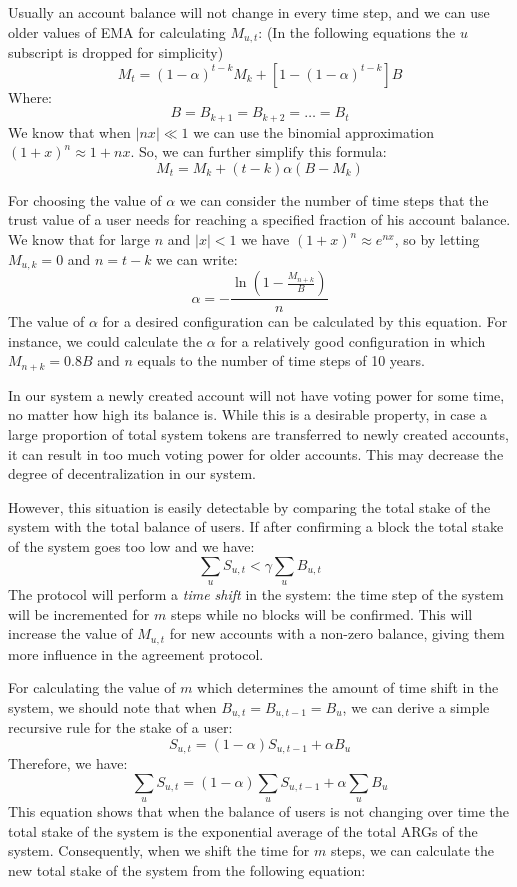 \documentclass[11pt, A4]{report}
\begin{document}
    Usually an account balance will not change in every time step, and we can use older values of EMA for calculating
    \(M_{u,t}\): (In the following equations the \(u\) subscript is dropped for simplicity)
    \[
        M_{t} = (1 - \alpha)^{t-k}M_{k} + [1 - (1 - \alpha)^{t - k}]B
    \]
    Where:
    \[
        B = B_{k+1} = B_{k+2} = \dots = B_{t}
    \]
    We know that when \(|nx| \ll 1\) we can use the binomial approximation \({(1 + x)^n \approx 1 + nx}\). So, we can
    further simplify this formula:
    \[
        M_{t} = M_{k} + (t - k) \alpha (B - M_{k})
    \]

    For choosing the value of \(\alpha\) we can consider the number of time steps that the trust value of a user needs
    for reaching a specified fraction of his account balance. We know that for large \(n\) and \(|x| < 1\) we have
    \((1 + x)^n \approx e^{nx}\), so by letting \(M_{u,k} = 0\) and \(n = t - k\) we can write:
    \[
        \alpha =- \frac{\ln\left(1 - \frac{M_{n+k}}{B}\right)}{n}
    \]
    The value of \(\alpha\) for a desired configuration can be calculated by this equation. For instance, we could
    calculate the \(\alpha\) for a relatively good configuration in which \(M_{n+k} = 0.8B\) and \(n\) equals to the
    number of time steps of 10 years.

    In our system a newly created account will not have voting power for some time, no matter how high its
    balance is. While this is a desirable property, in case a large proportion of total system tokens are
    transferred to newly created accounts, it can result in too much voting power for older accounts. This may decrease
    the degree of decentralization in our system.

    However, this situation is easily detectable by comparing the total stake of the system with the total balance of
    users. If after confirming a block the total stake of the system goes too low and we have:
    \[
        \sum_{u}S_{u,t} < \gamma \sum_{u}B_{u,t}
    \]
    The protocol will perform a \emph{time shift} in the system: the time step of the system
    will be incremented for \(m\) steps while no blocks will be confirmed. This will increase the value of \(M_{u,t}\)
    for new accounts with a non-zero balance, giving them more influence in the agreement protocol.

    For calculating the value of \(m\) which determines the amount of time shift in the system, we should note that when
    \(B_{u,t} = B_{u, t-1} = B_u\), we can derive a simple recursive rule for the stake of a user:
    \[
        S_{u,t} = (1 - \alpha) S_{u,t-1} + \alpha B_u
    \]
    Therefore, we have:
    \[
        \sum_{u}S_{u,t} = (1 - \alpha) \sum_{u}S_{u,t - 1} + \alpha \sum_{u}B_u
    \]
    This equation shows that when the balance of users is not changing over time the total stake of the system is the
    exponential average of the total ARGs of the system. Consequently, when we shift the time for \(m\) steps, we can
    calculate the new total stake of the system from the following equation:
\end{document}
